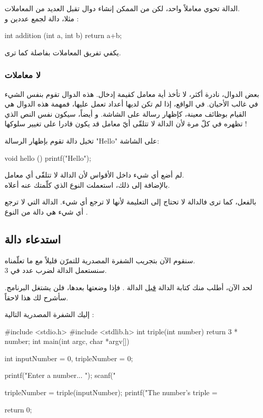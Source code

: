 الدالة
تحوي معاملاً واحد، لكن من الممكن إنشاء دوال تقبل العديد من المعاملات.\\
مثلا، دالة 
لجمع عددين
و 
 :

\begin{Csource}
int addition (int a, int b)
{
	return a+b;
}
\end{Csource}

يكفي تفريق المعاملات بفاصلة كما ترى.

\subsubsection{لا معاملات}

بعض الدوال، نادرة أكثر، لا تأخذ أية معامل كقيمة إدخال. هذه الدوال تقوم بنفس الشيء في غالب الأحيان. في الواقع، إذا لم تكن لديها أعداد تعمل عليها، فمهمة هذه الدوال هي القيام بوظائف معينة، كإظهار رسالة على الشاشة. و أيضاً، سيكون نفس النص الذي تظهره في كلّ مرة لأن الدالة لا تتلقّى أيّ معامل قد يكون قادرا على تغيير سلوكها !

تخيل دالة
تقوم بإظهار الرسالة
"\textenglish{Hello}"
على الشاشة:

\begin{Csource}
void hello ()
{
	printf("Hello");
}
\end{Csource}

لم أضع أي شيء داخل الأقواس لأن الدالة لا تتلقّى أي معامل.\\
بالإضافة إلى ذلك، استعملت النوع 
الذي كلّمتك عنه أعلاه.

بالفعل، كما ترى فالدالة لا تحتاج إلى التعليمة 
لأنها لا ترجع أي شيء. الدالة التي لا ترجع أي شيء هي دالة من النوع
.

\subsection{استدعاء دالة}

سنقوم الآن بتجريب الشفرة المصدرية للتمرّن قليلاً مع ما تعلّمناه.\\
سنستعمل الدالة 
لضرب عدد في 3.

لحد الآن، أطلب منك كتابة الدالة 
\underline{قبل}
الدالة 
.
فإذا وضعتها بعدها، فلن يشتغل البرنامج. سأشرح لك هذا لاحقاً.

إليك الشفرة المصدرية التالية :

\begin{Csource}
#include <stdio.h>
#include <stdlib.h>
int triple(int number)
{
	return 3 * number;
}   
int main(int argc, char *argv[])
{
	int inputNumber = 0, tripleNumber = 0;
	
	printf("Enter a number... ");
	scanf("%
	
	tripleNumber = triple(inputNumber);
	printf("The number's triple = %
	
	return 0;
}
\end{Csource}

